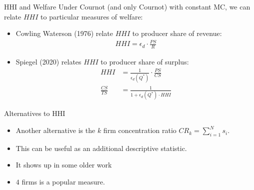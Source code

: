 \begin{frame}{HHI and Welfare}
Under Cournot (and only Cournot) with constant MC, we can relate $HHI$ to particular measures of welfare:
\begin{itemize}
\item Cowling Waterson (1976) relate $HHI$ to producer share of revenue:
\begin{align*}
HHI =  \epsilon_d \cdot \frac{PS}{R}
\end{align*}
\item Spiegel (2020) relates $HHI$ to producer share of surplus:
\begin{align*}
HHI &=  \frac{1}{\epsilon_d \left(Q^{*}\right)} \cdot \frac{PS}{CS}\\
\frac{C S}{TS} &=\frac{1}{1+\epsilon_d \left(Q^{*}\right) \cdot HHI}
\end{align*}
\end{itemize}
\end{frame}

\begin{frame}{Alternatives to HHI}
\begin{itemize}
\item Another alternative is the $k$ firm concentration ratio $CR_k = \sum_{i=1}^N s_i$.
\item This can be useful as an additional descriptive statistic.
\item It shows up in some older work
\item $4$ firms is a popular measure.
\end{itemize}
\end{frame}


